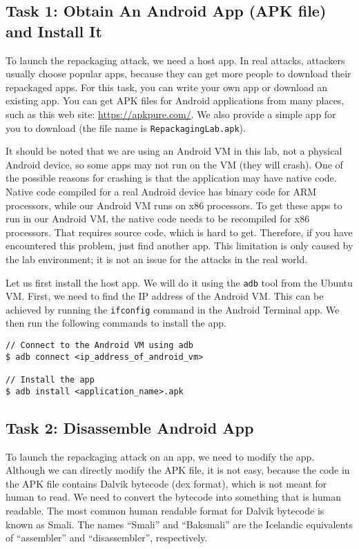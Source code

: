 \subsection{Task 1: Obtain An Android App (APK file) and Install It}


To launch the repackaging attack, we need a host app. In real attacks, attackers usually choose popular
apps, because they can get more people to download their repackaged apps.
For this task, you can write your own app or download an existing app.
You can get APK files for Android applications from many places, such as
this web site: \url{https://apkpure.com/}. We also provide a simple app for you to download
(the file name is \texttt{RepackagingLab.apk}).

It should be noted that we are using an Android VM in this lab, not a physical Android device,
so some apps may not run on the VM (they will crash). One of the possible reasons for crashing
is that the application may have native code. Native code compiled for a real Android device
has binary code for ARM processors, while our Android VM runs on x86 processors. To get these
apps to run in our Android VM, the native code needs to be recompiled for x86 processors. That
requires source code, which is hard to get.  Therefore, if you have encountered this problem,
just find another app. This limitation is only caused by the lab environment; it is not an
issue for the attacks in the real world.


Let us first install the host app. We will do it using the \texttt{adb} tool from the Ubuntu
VM. First, we need to find the IP address of the Android VM. This can be achieved by running
the \texttt{ifconfig} command in the Android Terminal app. We then run the following commands
to install the app.


\begin{lstlisting}
// Connect to the Android VM using adb
$ adb connect <ip_address_of_android_vm>

// Install the app
$ adb install <application_name>.apk
\end{lstlisting}




\subsection{Task 2: Disassemble Android App}

To launch the repackaging attack on an app, we need to modify the app. Although we can 
directly modify the APK file, it is not easy, because the code 
in the APK file contains Dalvik bytecode (dex format), which is not meant for human to read. We need to
convert the bytecode into something that is human readable. The most common human readable
format for Dalvik bytecode is known as Smali.  The names ``Smali'' and ``Baksmali''
are the Icelandic equivalents of ``assembler'' and ``disassembler'', respectively.

